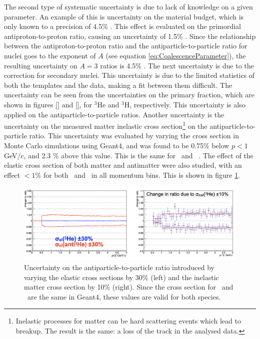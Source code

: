 The second type of systematic uncertainty is due to lack of knowledge on a given parameter. An example of this is uncertainty on the material budget, which is only known to a precision of 4.5\% . This effect is evaluated on the primordial antiproton-to-proton ratio, causing an uncertainty of 1.5\% . Since the relationship between the  antiproton-to-proton ratio and the antiparticle-to-particle ratio for nuclei goes to the exponent of $A$ (see equation \ref{eq:CoalescenceParameter}), the resulting uncertainty on $A=3$ ratios is 4.5\% . The next uncertainty is due to the correction for secondary nuclei. This uncertainty is due to the limited statistics of both the templates and the data, making a fit between them difficult. The uncertainty can be seen from the uncertainties on the primary fraction, which are shown in figures \ref{} and \ref{}, for $^3\mathrm{He}$ and $^3\mathrm{H}$, respectively. This uncertainty is also applied on the antiparticle-to-particle ratios. Another uncertainty is the uncertainty on the measured matter inelastic cross section\footnote{Inelastic processes for matter can be hard scattering events which lead to breakup. The result is the same: a loss of the track in the analysed data.} on the antiparticle-to-particle ratio. This uncertainty was evaluated by varying the cross section in Monte Carlo simulations using Geant4, and was found to be 0.75\% below $p<1$ GeV/$c$, and 2.3 \% above this value. This is the same for \ahe\ and \atrit\, . The effect of the elastic cross section of both matter and antimatter were also studied, with an effect $< 1$\% for both \ahe\ and \atrit\ in all momentum bins. This is shown in figure \ref{fig:syst_uncertainties_elastic_xs}. \\

\begin{figure}
    \centering
    \includegraphics[width=\textwidth]{figures/systematic_uncertainty_other_xs.png}
    \caption{Uncertainty on the antiparticle-to-particle ratio introduced by varying the elastic cross sections by 30\% (left) and the inelastic matter cross section by 10\% (right). Since the cross section for \atrit\ and \ahe\ are the same in Geant4, these values are valid for both species.}
    \label{fig:syst_uncertainties_elastic_xs}
\end{figure}

